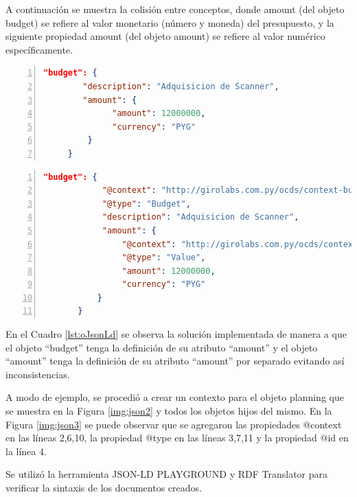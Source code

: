 A continuación se muestra la colisión entre conceptos, donde amount (del objeto budget) se refiere al valor monetario (número y moneda) del presupuesto, y la siguiente propiedad amount (del objeto amount) se refiere al valor numérico específicamente.\hfill \break

\noindent\begin{minipage}{\textwidth}
\begin{lstlisting}[captionpos=b, caption=Objeto JSON con colisión semántica entre conceptos, label=lst:oJson,language=json,firstnumber=1,  numbers=left,  numberstyle=\tiny\color{mygray},
    basicstyle=\footnotesize\ttfamily,frame=single]
    "budget": {
        "description": "Adquisicion de Scanner",
        "amount": {
              "amount": 12000000,
              "currency": "PYG"
         }
     }  
    \end{lstlisting}
\end{minipage}
\noindent\begin{minipage}{\textwidth}
    \begin{lstlisting}[captionpos=b, caption=Objeto JSON-LD. Sin colisión semántica entre conceptos , label=lst:oJsonLd, language=json,firstnumber=1,  numbers=left,  numberstyle=\tiny\color{mygray},
    basicstyle=\footnotesize\ttfamily,frame=single]
        "budget": {
            "@context": "http://girolabs.com.py/ocds/context-budget.json",
            "@type": "Budget",
            "description": "Adquisicion de Scanner",
            "amount": {
                "@context": "http://girolabs.com.py/ocds/context-value.json",
                "@type": "Value",
                "amount": 12000000,
                "currency": "PYG"
           }
       }   
        \end{lstlisting}
    \end{minipage}

        En el Cuadro \ref{lst:oJsonLd} se observa la solución implementada de manera a que el objeto “budget” tenga la definición de su atributo “amount” y el objeto “amount” tenga la definición de su atributo “amount” por separado evitando así inconsistencias.

A modo de ejemplo, se procedió a crear un contexto para el objeto planning que se muestra en la Figura \ref{img:json2} y todos los objetos hijos del mismo. En la Figura \ref{img:json3} se puede observar que se agregaron las propiedades @context en las líneas 2,6,10, la propiedad @type en las líneas 3,7,11 y la propiedad @id en la línea 4.

Se utilizó la herramienta JSON-LD PLAYGROUND \cite{JSONLDPl78:online} y RDF Translator \cite{RDFTrans0:online} para verificar la sintaxis de los documentos creados.

